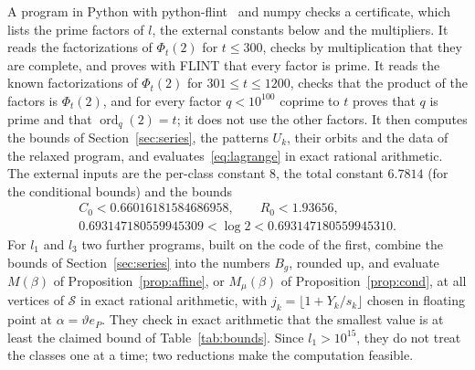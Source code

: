 \documentclass[11pt]{amsart}
\theoremstyle{definition}
\theoremstyle{remark}
\numberwithin{equation}{section}
\newcommand{\ord}{\operatorname{ord}}
\newcommand{\Lich}{6.7814}
\begin{document}
A program in Python with python-flint~\cite{FLINT} and numpy checks a certificate, which lists the prime factors of $l$, the external constants below and the multipliers. It reads the factorizations of $\Phi_t(2)$ for $t\le300$, checks by multiplication that they are complete, and proves with FLINT that every factor is prime. It reads the known factorizations of $\Phi_t(2)$ for $301\le t\le1200$, checks that the product of the factors is $\Phi_t(2)$, and for every factor $q<10^{100}$ coprime to $t$ proves that $q$ is prime and that $\ord_q(2)=t$; it does not use the other factors. It then computes the bounds of Section~\ref{sec:series}, the patterns $U_k$, their orbits and the data of the relaxed program, and evaluates~\eqref{eq:lagrange} in exact rational arithmetic. The external inputs are the per-class constant $8$, the total constant $\Lich$ (for the conditional bounds) and the bounds
\begin{gather*}
C_0<0.66016181584686958,\qquad R_0<1.93656,\\
0.693147180559945309<\log2<0.693147180559945310.
\end{gather*}
For $l_1$ and $l_3$ two further programs, built on the code of the first, combine the bounds of Section~\ref{sec:series} into the numbers $B_g$, rounded up, and evaluate $M(\beta)$ of Proposition~\ref{prop:affine}, or $M_\mu(\beta)$ of Proposition~\ref{prop:cond}, at all vertices of $\mathcal S$ in exact rational arithmetic, with $j_k=\lfloor1+Y_k/s_k\rfloor$ chosen in floating point at $\alpha=\vartheta e_P$. They check in exact arithmetic that the smallest value is at least the claimed bound of Table~\ref{tab:bounds}. Since $l_1>10^{15}$, they do not treat the classes one at a time; two reductions make the computation feasible.
\end{document}

